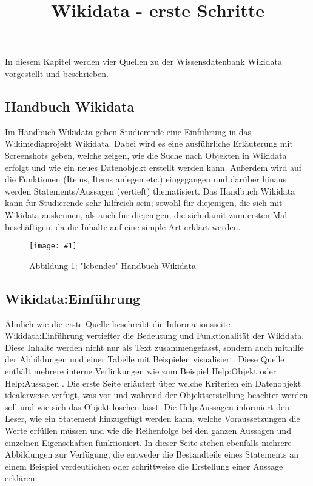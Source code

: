 \documentclass{article}
\newlength{\imgwidth}
\newcommand\scaledgraphics[2]{%
                
\settowidth{\imgwidth}{\texttt{[image: \#1]}}%
                
\setlength{\imgwidth}{\minof{\imgwidth}{#2\textwidth}}%
                
\texttt{[image: \#1]}%
                
}
\begin{document}
\title{Wikidata - erste Schritte}

\maketitle





In diesem Kapitel werden vier Quellen zu der Wissensdatenbank Wikidata vorgestellt und beschrieben.


\subsection{Handbuch Wikidata}\label{H2539699}



Im Handbuch Wikidata \autocite{solohub_handbuch_2021} geben Studierende eine Einführung in das Wikimediaprojekt Wikidata. Dabei wird es eine ausführliche Erläuterung mit Screenshots geben, welche zeigen, wie die Suche nach Objekten in Wikidata erfolgt und wie ein neues Datenobjekt erstellt werden kann. Außerdem wird auf die Funktionen (Items, Items anlegen etc.) eingegangen und darüber hinaus werden Statements/Aussagen (vertieft) thematisiert. Das Handbuch Wikidata kann für Studierende sehr hilfreich sein; sowohl für diejenigen, die sich mit Wikidata auskennen, als auch für diejenigen, die sich damit zum ersten Mal beschäftigen, da die Inhalte auf eine simple Art erklärt werden. 

\begin{figure}
\scaledgraphics{c974b28d-908a-42e2-9445-5efb50e2817b.png}{1}
\caption*{Abbildung 1: "lebendes" Handbuch Wikidata}\label{F44920591}
\end{figure}





\subsection{Wikidata:Einführung}\label{H8838465}



Ähnlich wie die erste Quelle beschreibt die Informationsseite Wikidata:Einführung \autocite{noauthor_wikidataeinfuhrung_nodate} vertiefter die Bedeutung und Funktionalität der Wikidata. Diese Inhalte werden nicht nur als Text zusammengefasst, sondern auch mithilfe der Abbildungen und einer Tabelle mit Beispielen visualisiert. Diese Quelle enthält mehrere interne Verlinkungen wie zum Beispiel Help:Objekt \autocite{wikidata_helpobjekte_nodate} oder Help:Aussagen \autocite{wikidata_helpaussagen_nodate}. Die erste Seite erläutert über welche Kriterien ein Datenobjekt idealerweise verfügt, was vor und während der Objektserstellung beachtet werden soll und wie sich das Objekt löschen lässt. Die Help:Aussagen informiert den Leser, wie ein Statement hinzugefügt werden kann, welche Voraussetzungen die Werte erfüllen müssen und wie die Reihenfolge bei den ganzen Aussagen und einzelnen Eigenschaften funktioniert. In dieser Seite stehen ebenfalls mehrere Abbildungen zur Verfügung, die entweder die Bestandteile eines Statements an einem Beispiel verdeutlichen oder schrittweise die Erstellung einer Aussage erklären.
\end{document}
